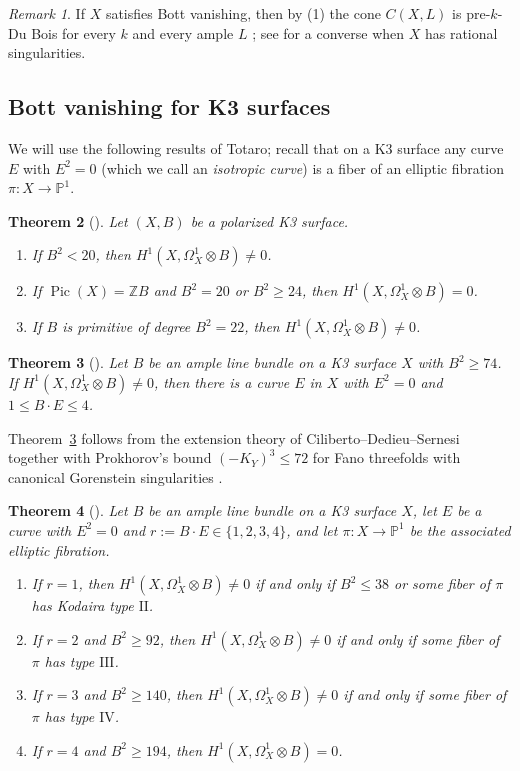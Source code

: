 \documentclass[11pt]{amsart}
\numberwithin{equation}{section}
\theoremstyle{plain}
\newtheorem{theorem}{Theorem}[section]
\theoremstyle{definition}
\theoremstyle{remark}
\newtheorem{remark}[theorem]{Remark}
\newcommand{\ZZ}{\mathbb{Z}}
\newcommand{\PP}{\mathbb{P}}
\newcommand{\Pic}{\operatorname{Pic}}
\begin{document}
\begin{remark}\label{rem:bott}
If $X$ satisfies Bott vanishing, then by (1) the cone $C(X,L)$ is pre-$k$-Du Bois for every $k$ and every ample $L$ \cite[Cor.~7.6]{SVV}; see \cite[\S7]{PS} for a converse when $X$ has rational singularities.
\end{remark}

\subsection{Bott vanishing for K3 surfaces}\label{ssec:totaro}
We will use the following results of Totaro; recall that on a K3 surface any curve $E$ with $E^2=0$ (which we call an \emph{isotropic curve}) is a fiber of an elliptic fibration $\pi\colon X\to\PP^1$.

\begin{theorem}[{\cite[Thm.~3.1, 3.2]{Tot}}]\label{thm:tot32}
Let $(X,B)$ be a polarized K3 surface.
\begin{enumerate}
\item If $B^2<20$, then $H^1(X,\Omega^1_X\otimes B)\ne0$.
\item If $\Pic(X)=\ZZ B$ and $B^2=20$ or $B^2\ge24$, then $H^1(X,\Omega^1_X\otimes B)=0$.
\item If $B$ is primitive of degree $B^2=22$, then $H^1(X,\Omega^1_X\otimes B)\ne0$.
\end{enumerate}
\end{theorem}

\begin{theorem}[{\cite[Thm.~5.1]{Tot}}]\label{thm:tot51}
Let $B$ be an ample line bundle on a K3 surface $X$ with $B^2\ge74$.
If $H^1(X,\Omega^1_X\otimes B)\ne0$, then there is a curve $E$ in $X$ with $E^2=0$ and $1\le B\cdot E\le 4$.
\end{theorem}

Theorem~\ref{thm:tot51} follows from the extension theory of Ciliberto--Dedieu--Sernesi \cite{CDS} together with Prokhorov's bound $(-K_Y)^3\le72$ for Fano threefolds with canonical Gorenstein singularities \cite{Pro}.

\begin{theorem}[{\cite[Thm.~6.1, 6.2]{Tot}}]\label{thm:tot6}
Let $B$ be an ample line bundle on a K3 surface $X$, let $E$ be a curve with $E^2=0$ and $r:=B\cdot E\in\{1,2,3,4\}$, and let $\pi\colon X\to\PP^1$ be the associated elliptic fibration.
\begin{enumerate}
\item If $r=1$, then $H^1(X,\Omega^1_X\otimes B)\ne0$ if and only if $B^2\le38$ or some fiber of $\pi$ has Kodaira type $\mathrm{II}$.
\item If $r=2$ and $B^2\ge92$, then $H^1(X,\Omega^1_X\otimes B)\ne0$ if and only if some fiber of $\pi$ has type $\mathrm{III}$.
\item If $r=3$ and $B^2\ge140$, then $H^1(X,\Omega^1_X\otimes B)\ne0$ if and only if some fiber of $\pi$ has type $\mathrm{IV}$.
\item If $r=4$ and $B^2\ge194$, then $H^1(X,\Omega^1_X\otimes B)=0$.
\end{enumerate}
\end{theorem}
\end{document}
